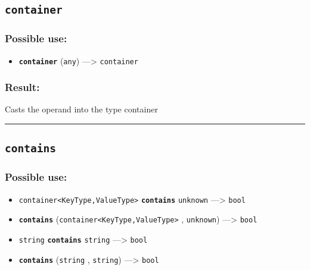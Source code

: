 \documentclass[]{book}
\providecommand{\tightlist}{%
  \setlength{\itemsep}{0pt}\setlength{\parskip}{0pt}}
\theoremstyle{definition}
\theoremstyle{definition}
\theoremstyle{definition}
\theoremstyle{remark}
\begin{document}
\subsection{\texorpdfstring{\texttt{container}}{container}}\label{container}

\subsubsection{Possible use:}\label{possible-use-98}

\begin{itemize}
\tightlist
\item
  \textbf{\texttt{container}} (\texttt{any}) ---\textgreater{}
  \texttt{container}
\end{itemize}

\subsubsection{Result:}\label{result-96}

Casts the operand into the type container

\begin{center}\rule{0.5\linewidth}{\linethickness}\end{center}

\subsection{\texorpdfstring{\texttt{contains}}{contains}}\label{contains}

\subsubsection{Possible use:}\label{possible-use-99}

\begin{itemize}
\tightlist
\item
  \texttt{container\textless{}KeyType,ValueType\textgreater{}}
  \textbf{\texttt{contains}} \texttt{unknown} ---\textgreater{}
  \texttt{bool}
\item
  \textbf{\texttt{contains}}
  (\texttt{container\textless{}KeyType,ValueType\textgreater{}} ,
  \texttt{unknown}) ---\textgreater{} \texttt{bool}
\item
  \texttt{string} \textbf{\texttt{contains}} \texttt{string}
  ---\textgreater{} \texttt{bool}
\item
  \textbf{\texttt{contains}} (\texttt{string} , \texttt{string})
  ---\textgreater{} \texttt{bool}
\end{itemize}
\end{document}
